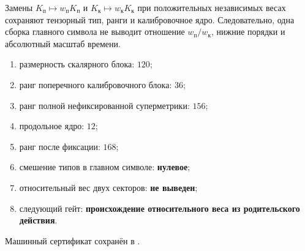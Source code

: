 \begin{nogocriterion}
Замены $K_{\text{п}}\mapsto w_{\text{п}}K_{\text{п}}$ и
$K_{\text{к}}\mapsto w_{\text{к}}K_{\text{к}}$ при положительных
независимых весах сохраняют тензорный тип, ранги и калибровочное ядро.
Следовательно, одна сборка главного символа не выводит отношение
$w_{\text{п}}/w_{\text{к}}$, нижние порядки и абсолютный масштаб времени.
\end{nogocriterion}

\begin{protocol}
\begin{enumerate}
 \item размерность скалярного блока: \textbf{$120$};
 \item ранг поперечного калибровочного блока: \textbf{$36$};
 \item ранг полной нефиксированной суперметрики: \textbf{$156$};
 \item продольное ядро: \textbf{$12$};
 \item ранг после фиксации: \textbf{$168$};
 \item смешение типов в главном символе: \textbf{нулевое};
 \item относительный вес двух секторов: \textbf{не выведен};
 \item следующий гейт: \textbf{происхождение относительного веса из родительского действия}.
\end{enumerate}
\end{protocol}

Машинный сертификат сохранён в
.
